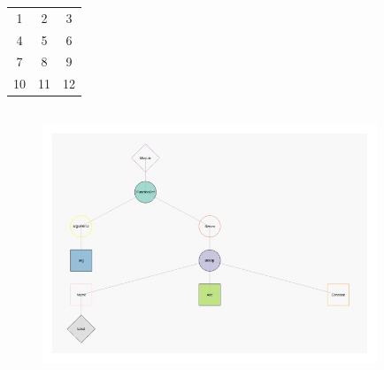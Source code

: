 \documentclass{article}
\begin{document}
\begin{tabular}{ |c|c|c| }
\hline 
1 & 2 & 3 \\ 
4 & 5 & 6 \\ 
7 & 8 & 9 \\ 
10 & 11 & 12 \\ 
\hline 
\end{tabular}
\begin{figure}[h]
\includegraphics[width=10cm, height=8cm]{ast_new.jpg}
\end{figure}
\end{document}
